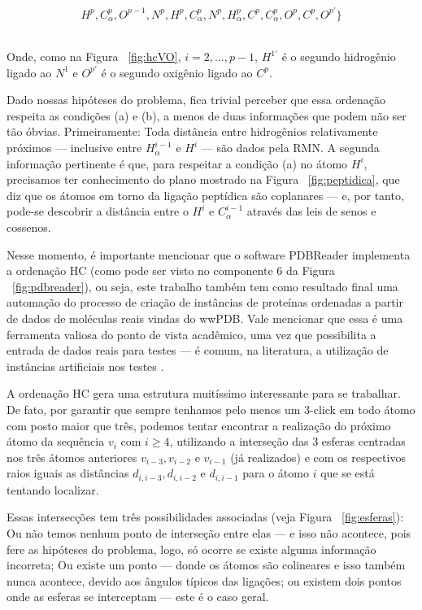 \documentclass[a4paper,12pt]{article}
\begin{document}
	\hspace{4.5cm}
	\begin{minipage}{0.532\linewidth}
		\vspace{-0.7cm}
		$$
		H^p, C_{\alpha}^p, O^{p-1}, N^p, H^p, C^{p}_\alpha, N^p, H^{p}_\alpha, C^p, C_{\alpha}^p, O^p, C^p, O^{p'}\}
		$$
	\end{minipage}
	\\

	Onde, como na Figura ~\ref{fig:hcVO}, $i = 2, \dots, p-1$, $H^{1'}$ é o segundo hidrogênio ligado ao $N^1$ e $O^{p'}$ é o segundo oxigênio ligado ao $C^p$.
	
	Dado nossas hipóteses do problema, fica trivial perceber que essa ordenação respeita as condições (a) e (b), a menos de duas informações que podem não ser tão óbvias. Primeiramente: Toda distância entre hidrogênios relativamente próximos --- inclusive entre $H_\alpha^{i-1}$ e $H^{i}$ --- são dados pela RMN. A segunda informação pertinente é que, para respeitar a condição (a) no átomo $H^i$, precisamos ter conhecimento do plano mostrado na Figura ~\ref{fig:peptidica}, que diz que os átomos em torno da ligação peptídica são coplanares --- e, por tanto, pode-se descobrir a distância entre o $H^i$ e $C_\alpha^{i-1}$ através das leis de senos e cossenos. 
 	
 	Nesse momento, é importante mencionar que o software PDBReader implementa a ordenação HC (como pode ser visto no componente 6 da Figura ~\ref{fig:pdbreader}), ou seja, este trabalho também tem como resultado final uma automação do processo de criação de instâncias de proteínas ordenadas a partir de dados de moléculas reais vindas do wwPDB. Vale mencionar que essa é uma ferramenta valiosa do ponto de vista acadêmico, uma vez que possibilita a entrada de dados reais para testes --- é comum, na literatura, a utilização de instâncias artificiais nos testes \cite{carlile:BP} \cite{carlile:instancesMDGP}.
 	
 	A ordenação HC gera uma estrutura muitíssimo interessante para se trabalhar. De fato, por garantir que sempre tenhamos pelo menos um 3-click em todo átomo com posto maior que três, podemos tentar encontrar a realização do próximo átomo da sequência $v_i$ com $i \geq 4$, utilizando a interseção das 3 esferas centradas nos três átomos anteriores $v_{i-3}, v_{i-2}$ e $v_{i-1}$ (já realizados) e com os respectivos raios iguais as distâncias $d_{i,i-3}, d_{i,i-2}$ e $d_{i,i-1}$ para o átomo $i$ que se está tentando localizar. 
 	
 	Essas intersecções tem três possibilidades associadas (veja Figura ~\ref{fig:esferas}): Ou não temos nenhum ponto de interseção entre elas --- e isso não acontece, pois fere as hipóteses do problema, logo, só ocorre se existe alguma informação incorreta; Ou existe um ponto --- donde os átomos são colineares e isso também nunca acontece, devido aos ângulos típicos das ligações; ou existem dois pontos onde as esferas se interceptam --- este é o caso geral.
 	
\end{document}
